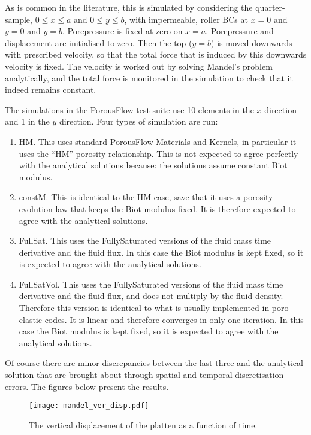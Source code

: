As is common in the literature, this is simulated by considering the
quarter-sample, $0\leq x \leq a$ and $0\leq y\leq b$, with
impermeable, roller BCs at $x=0$ and $y=0$ and $y=b$.  Porepressure is
fixed at zero on $x=a$.  Porepressure and displacement are initialised
to zero.  Then the top ($y=b$) is moved downwards with prescribed
velocity, so that the total force that is induced by this downwards
velocity is fixed.  The velocity is worked out by solving Mandel's
problem analytically, and the total force is monitored in the
simulation to check that it indeed remains constant.

The simulations in the PorousFlow test suite use 10 elements in the
$x$ direction and 1 in the $y$ direction.  Four types of simulation
are run:
\begin{enumerate}
\item HM.  This uses standard PorousFlow Materials and Kernels, in
  particular it uses the ``HM'' porosity relationship.  This is not
  expected to agree perfectly with the analytical solutions because:
  the solutions assume constant Biot modulus.
\item constM.  This is identical to the HM case, save that it uses a
  porosity evolution law that keeps the Biot modulus fixed.  It is
  therefore expected to agree with the analytical solutions.
\item FullSat.  This uses the FullySaturated versions of the fluid
  mass time derivative and the fluid flux.  In this case the Biot
  modulus is kept fixed, so it is expected to agree with the
  analytical solutions.
\item FullSatVol.  This uses the FullySaturated versions of the fluid
  mass time derivative and the fluid flux, and does not multiply by
  the fluid density.  Therefore this version is identical to what is
  usually implemented in poro-elastic codes.  It is linear and
  therefore converges in only one iteration.  In this case the Biot
  modulus is kept fixed, so it is expected to agree with the
  analytical solutions.
\end{enumerate}
Of course there are minor discrepancies between the last three and the
analytical solution that are brought about through spatial and
temporal discretisation errors.  The figures below present the
results.

\begin{figure}[htb]
\begin{center}
\texttt{[image: mandel\_ver\_disp.pdf]}
\caption{The vertical displacement of the platten as a function of time.}
\label{mandel_ver_disp.fig}
\end{center}
\end{figure}

